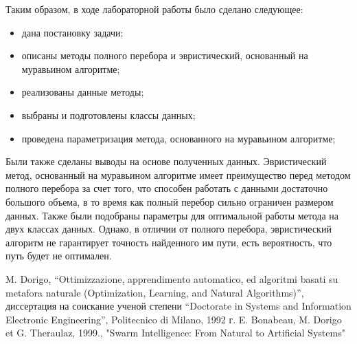 \documentclass[a4paper,12pt]{article}
\begin{document}
        Таким образом, в ходе лабораторной работы было сделано следующее:
        \begin{itemize}
			\item дана постановку задачи;
			\item описаны методы полного перебора и эвристический, основанный на муравьином алгоритме;
			\item реализованы данные методы;
			\item выбраны и подготовлены классы данных;
			\item проведена параметризация метода, основанного на муравьином алгоритме;
        \end{itemize}
    
    Были также сделаны выводы на основе полученных данных. Эвристический метод, основанный на муравьином алгоритме имеет преимущество перед методом полного перебора за счет того, что способен работать с данными достаточно большого объема, в то время как полный перебор сильно ограничен размером данных. Также были подобраны параметры для оптимальной работы метода на двух классах данных. Однако, в отличии от полного перебора, эвристический алгоритм не гарантирует точность найденного им пути, есть вероятность, что путь будет не оптимален. 
    \newpage

    \begin{center}        
        \begin{thebibliography}{}
        	  M. Dorigo, “Ottimizzazione, apprendimento automatico, ed algoritmi basati su metafora naturale (Optimization, Learning, and Natural Algorithms)”, диссертация на соискание ученой степени “Doctorate in Systems and Information Electronic Engineering”, Politecnico di Milano, 1992 г.  
           	 E. Bonabeau, M. Dorigo et G. Theraulaz, 1999.,  "Swarm Intelligence: From Natural to Artificial Systems"          	        	
        \end{thebibliography}
    \end{center}
\end{document}
